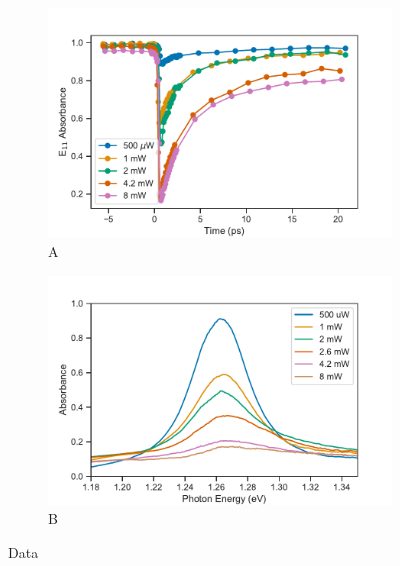 \begin{figure}[H]
	\centering
	\begin{subfigure}{0.46\textwidth}
		\centering
		\includegraphics[scale=0.55]{images/chapter_my_data/absorbance_dynamics_E11}
		\caption{A}
	\end{subfigure}
	\qquad
	\centering
	\begin{subfigure}{0.46\textwidth}
		\centering
		\includegraphics[scale=0.55]{images/chapter_my_data/peak_abs_vs_pump}
		\caption{B}
	\end{subfigure}
	\caption{Data}
\end{figure}


